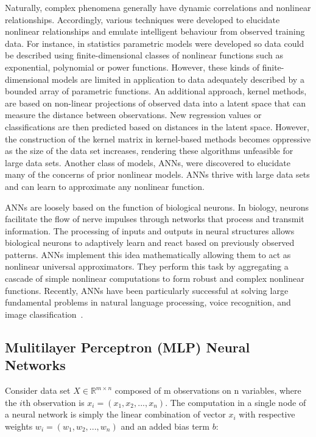 Naturally, complex phenomena generally have dynamic correlations and nonlinear relationships. Accordingly, various techniques were developed to elucidate nonlinear relationships and emulate intelligent behaviour from observed training data. For instance, in statistics parametric models were developed so data could be described using finite-dimensional classes of nonlinear functions such as exponential, polynomial or power functions. However, these kinds of finite-dimensional models are limited in application to data adequately described by a bounded array of parametric functions. An additional approach, kernel methods, are based on non-linear projections of observed data into a latent space that can measure the distance between observations. New regression values or classifications are then predicted based on distances in the latent space. However, the construction of the kernel matrix in kernel-based methods becomes oppressive as the size of the data set increases, rendering these algorithms unfeasible for large data sets. Another class of models, ANNs, were discovered to elucidate many of the concerns of prior nonlinear models. ANNs thrive with large data sets and can learn to approximate any nonlinear function.

ANNs are loosely based on the function of biological neurons. In biology, neurons facilitate the flow of nerve impulses through networks that process and transmit information. The processing of inputs and outputs in neural structures allows biological neurons to adaptively learn and react based on previously observed patterns. ANNs implement this idea mathematically allowing them to act as nonlinear universal approximators. They perform this task by aggregating a cascade of simple nonlinear computations to form robust and complex nonlinear functions. Recently, ANNs have been particularly successful at solving large fundamental problems in natural language processing, voice recognition, and image classification~\cite{collobert2011natural, hinton2012deep, cirecsan2012multi}. 

\subsection{Mulitilayer Perceptron (MLP) Neural Networks}

Consider data set $X \in \mathbb{R}^{m\times n} $ composed of m observations on n variables, where the $i$th observation is $x_i = (x_1,x_2,...,x_n)$. The computation in a single node of a neural network is simply the linear combination of vector $x_i$ with respective weights $w_i = (w_1,w_2,...,w_n)$ and an added bias term $b$:

